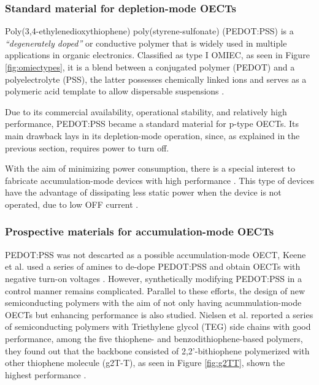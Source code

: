 \subsubsection{Standard material for depletion-mode OECTs}

Poly(3,4-ethylenedioxythiophene) poly(styrene-sulfonate) (PEDOT:PSS) is a \textit{``degenerately doped''} \cite{bernardsSteadyStateTransientBehavior2007} or conductive polymer that is widely used in multiple applications in organic electronics. Classified as type I OMIEC, as seen in Figure \ref{fig:omiectypes}, it is a blend between a conjugated polymer (PEDOT) and a polyelectrolyte (PSS), the latter possesses chemically linked ions and serves as a polymeric acid template to allow dispersable suspensions \cite{paulsenOrganicMixedIonic2020}.

Due to its commercial availability, operational stability, and relatively high performance, PEDOT:PSS became a standard material for p-type OECTs. Its main drawback lays in its depletion-mode operation, since, as explained in the previous section, requires power to turn off. 

With the aim of minimizing power consumption, there is a special interest to fabricate accumulation-mode devices with high performance \cite{nielsenMolecularDesignSemiconducting2016}\cite{tanOrganicMixedIonic2022}\cite{inalBenchmarkingOrganicMixed2017}\cite{keeneEnhancementModePEDOTPSS2020}. This type of devices have the advantage of dissipating less static power when the device is not operated, due to low OFF current %
\cite{giovannittiEnergeticControlRedoxActive2020}.

\subsubsection{Prospective materials for accumulation-mode OECTs}
PEDOT:PSS was not descarted as a possible accumulation-mode OECT, Keene et al. used a series of amines to de-dope PEDOT:PSS and obtain OECTs with negative turn-on voltages \cite{keeneEnhancementModePEDOTPSS2020}. However, synthetically modifying PEDOT:PSS in a control manner remains complicated. Parallel to these efforts, the design of new semiconducting polymers with the aim of not only having acummulation-mode OECTs but enhancing performance is also studied. Nielsen et al. reported a series of semiconducting polymers with Triethylene glycol (TEG) side chains with good performance, among the five thiophene- and benzodithiophene-based polymers, they found out that the %
backbone consisted of 2,2'-bithiophene polymerized with other thiophene molecule (g2T-T), as seen in Figure \ref{fig:g2TT}, shown the highest performance %
\cite{nielsenMolecularDesignSemiconducting2016}.

